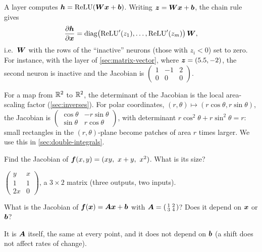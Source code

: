 \begin{example}\label{ex:layer-jacobian}
A layer computes $\bm{h} = \operatorname{ReLU}(\bm{W}\bm{x} + \bm{b})$. Writing $\bm{z} = \bm{W}\bm{x} + \bm{b}$, the
chain rule gives
\[
  \frac{\partial \bm{h}}{\partial \bm{x}} = \operatorname{diag}\bigl(\operatorname{ReLU}'(z_1), \dots, \operatorname{ReLU}'(z_m)\bigr)\,\bm{W} ,
\]
i.e.\ $\bm{W}$ with the rows of the ``inactive'' neurons (those with $z_i < 0$) set to
zero. For instance, with the layer of \cref{sec:matrix-vector}, where
$\bm{z} = (5.5, -2)$, the second neuron is inactive and the Jacobian is
$\left(\begin{smallmatrix} 1 & -1 & 2\\ 0 & 0 & 0\end{smallmatrix}\right)$.
\end{example}

\begin{remark}
For a map from $\mathbb{R}^2$ to $\mathbb{R}^2$, the determinant of the Jacobian is the local
area-scaling factor (\cref{sec:inverses}). For polar coordinates,
$(r, \theta)\mapsto(r\cos\theta, r\sin\theta)$, the Jacobian is
$\left(\begin{smallmatrix} \cos\theta & -r\sin\theta\\ \sin\theta &
r\cos\theta\end{smallmatrix}\right)$, with determinant
$r\cos^2\theta + r\sin^2\theta = r$: small rectangles in the $(r,\theta)$-plane
become patches of area $r$ times larger. We use this in
\cref{sec:double-integrals}.
\end{remark}

\sectionexercises

\begin{exercise}
Find the Jacobian of $\bm{f}(x, y) = (xy,\ x + y,\ x^2)$. What is its size?
\end{exercise}
\begin{solution}
$\left(\begin{smallmatrix} y & x\\ 1 & 1\\ 2x & 0\end{smallmatrix}\right)$, a
$3\times2$ matrix (three outputs, two inputs).
\end{solution}

\begin{exercise}
What is the Jacobian of $\bm{f}(\bm{x}) = \bm{A}\bm{x} + \bm{b}$ with
$\bm{A} = \left(\begin{smallmatrix} 1 & 2\\ 3 & 4\end{smallmatrix}\right)$? Does it
depend on $\bm{x}$ or $\bm{b}$?
\end{exercise}
\begin{solution}
It is $\bm{A}$ itself, the same at every point, and it does not depend on $\bm{b}$
(a shift does not affect rates of change).
\end{solution}

